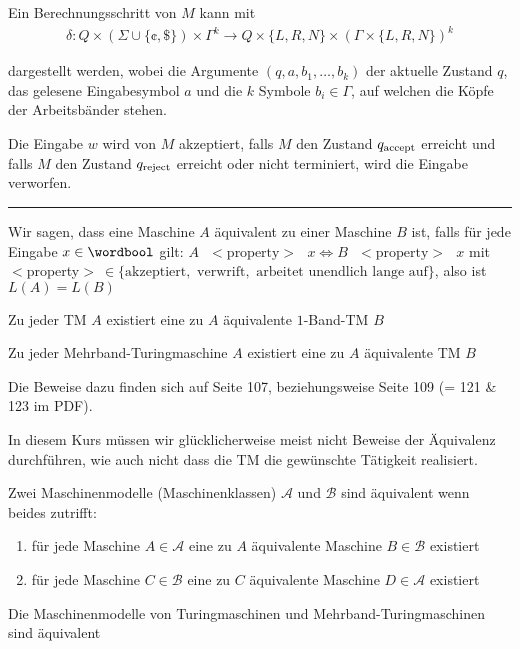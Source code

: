 Ein Berechnungsschritt von $M$ kann mit
\rmvspace
\begin{align*}
    \delta: Q \times (\Sigma \cup \{ \cent, \$ \}) \times \Gamma^k \rightarrow Q \times \{ L, R, N \} \times (\Gamma \times \{ L, R, N \})^k
\end{align*}

\drmvspace
dargestellt werden, wobei die Argumente $(q, a, b_1, \ldots, b_k)$ der aktuelle Zustand $q$, das gelesene Eingabesymbol $a$ und die $k$ Symbole $b_i \in \Gamma$,
auf welchen die Köpfe der Arbeitsbänder stehen.

Die Eingabe $w$ wird von $M$ akzeptiert, falls $M$ den Zustand $q_{\text{accept}}$ erreicht und falls $M$ den Zustand $q_{\text{reject}}$ erreicht oder nicht terminiert, wird die Eingabe verworfen.

\vspace{0.3cm}
\hrule
\vspace{0.2cm}

Wir sagen, dass eine Maschine $A$ äquivalent zu einer Maschine $B$ ist, falls für jede Eingabe $x \in \wordbool$ gilt:
$A \text{ $<$property$>$ } x \Longleftrightarrow B \text{ $<$property$>$ } x$ mit
$<$property$> \ \in \{ \text{akzeptiert}, \text{ verwrift}, \text{ arbeitet unendlich lange auf} \}$, also ist $L(A) = L(B)$

\inlinelemma Zu jeder TM $A$ existiert eine zu $A$ äquivalente $1$-Band-TM $B$

\inlinelemma Zu jeder Mehrband-Turingmaschine $A$ existiert eine zu $A$ äquivalente TM $B$

Die Beweise dazu finden sich auf Seite 107, beziehungsweise Seite 109 (= 121 \& 123 im PDF).

In diesem Kurs müssen wir glücklicherweise meist nicht Beweise der Äquivalenz durchführen, wie auch nicht dass die TM die gewünschte Tätigkeit realisiert.

\inlinedef Zwei Maschinenmodelle (Maschinenklassen) $\mathcal{A}$ und $\mathcal{B}$ sind äquivalent wenn beides zutrifft:
\begin{enumerate}[label=(\roman*)]
    \item für jede Maschine $A \in \mathcal{A}$ eine zu $A$ äquivalente Maschine $B \in \mathcal{B}$ existiert
    \item für jede Maschine $C \in \mathcal{B}$ eine zu $C$ äquivalente Maschine $D \in \mathcal{A}$ existiert
\end{enumerate}

\inlinetheorem Die Maschinenmodelle von Turingmaschinen und Mehrband-Turingmaschinen sind äquivalent

